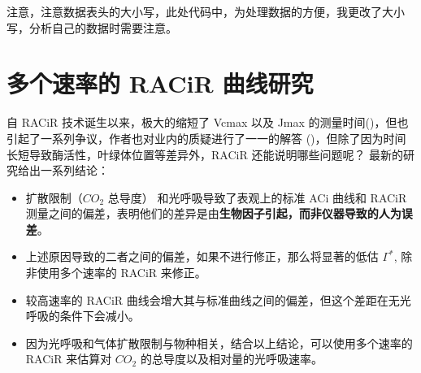\documentclass[
]{krantz}
\makeatletter
\newenvironment{Shaded}{\begin{snugshade}}{\end{snugshade}}
\newcommand{\CommentTok}[1]{\textcolor[rgb]{0.56,0.35,0.01}{\textit{#1}}}
\newcommand{\DataTypeTok}[1]{\textcolor[rgb]{0.13,0.29,0.53}{#1}}
\newcommand{\FloatTok}[1]{\textcolor[rgb]{0.00,0.00,0.81}{#1}}
\newcommand{\KeywordTok}[1]{\textcolor[rgb]{0.13,0.29,0.53}{\textbf{#1}}}
\newcommand{\NormalTok}[1]{#1}
\newcommand{\OperatorTok}[1]{\textcolor[rgb]{0.81,0.36,0.00}{\textbf{#1}}}
\newcommand{\StringTok}[1]{\textcolor[rgb]{0.31,0.60,0.02}{#1}}
\newenvironment{kframe}{%
\medskip{}
\setlength{\fboxsep}{.8em}
 \def\at@end@of@kframe{}%
 \ifinner\ifhmode%
  \def\at@end@of@kframe{\end{minipage}}%
  \begin{minipage}{\columnwidth}%
 \fi\fi%
 \def\FrameCommand##1{\hskip\@totalleftmargin \hskip-\fboxsep
 \colorbox{shadecolor}{##1}\hskip-\fboxsep
     \hskip-\linewidth \hskip-\@totalleftmargin \hskip\columnwidth}%
 \MakeFramed {\advance\hsize-\width
   \@totalleftmargin\z@ \linewidth\hsize
   \@setminipage}}%
 {\par\unskip\endMakeFramed%
 \at@end@of@kframe}
\renewenvironment{Shaded}{\begin{kframe}}{\end{kframe}}
\makeatother
\begin{document}
\begin{Shaded}
\end{Shaded}

注意，注意数据表头的大小写，此处代码中，为处理数据的方便，我更改了大小写，分析自己的数据时需要注意。

\cleardoublepage

\hypertarget{multi1}{%
\section{多个速率的 RACiR 曲线研究}\label{multi1}}

自 RACiR 技术诞生以来，极大的缩短了 Vcmax 以及 Jmax 的测量时间(\citet{stinziano2017})，但也引起了一系列争议，作者也对业内的质疑进行了一一的解答 (\citet{stinziano2018})，但除了因为时间长短导致酶活性，叶绿体位置等差异外，RACiR 还能说明哪些问题呢？\citet{stinziano2019} 最新的研究给出一系列结论：

\begin{itemize}
\item
  扩散限制（\(CO_2\) 总导度） 和光呼吸导致了表观上的标准 ACi 曲线和 RACiR 测量之间的偏差，表明他们的差异是由\textbf{生物因子引起，而非仪器导致的人为误差}。
\item
  上述原因导致的二者之间的偏差，如果不进行修正，那么将显著的低估 \(\Gamma^*\), 除非使用多个速率的 RACiR 来修正。
\item
  较高速率的 RACiR 曲线会增大其与标准曲线之间的偏差，但这个差距在无光呼吸的条件下会减小。
\item
  因为光呼吸和气体扩散限制与物种相关，结合以上结论，可以使用多个速率的 RACiR 来估算对 \(CO_2\) 的总导度以及相对量的光呼吸速率。
\end{itemize}
\end{document}
